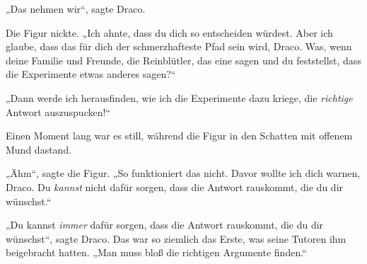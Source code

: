 „Das nehmen wir“, sagte Draco.

Die Figur nickte. „Ich ahnte, dass du dich so entscheiden würdest. Aber ich glaube, dass das für dich der schmerzhafteste Pfad sein wird, Draco. Was, wenn deine Familie und Freunde, die Reinblütler, das eine sagen und du feststellst, dass die Experimente etwas anderes sagen?“

„Dann werde ich herausfinden, wie ich die Experimente dazu kriege, die \emph{richtige} Antwort auszuspucken!“

Einen Moment lang war es still, während die Figur in den Schatten mit offenem Mund dastand.

„Ähm“, sagte die Figur. „So funktioniert das nicht. Davor wollte ich dich warnen, Draco. Du \emph{kannst} nicht dafür sorgen, dass die Antwort rauskommt, die du dir wünschst.“

„Du kannst \emph{immer} dafür sorgen, dass die Antwort rauskommt, die du dir wünschst“, sagte Draco. Das war so ziemlich das Erste, was seine Tutoren ihm beigebracht hatten. „Man muss bloß die richtigen Argumente finden.“

